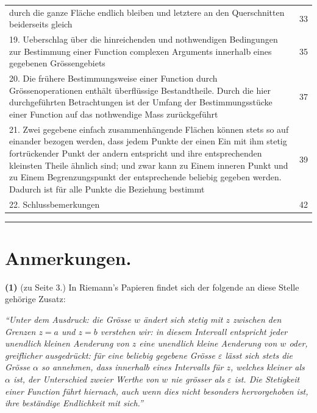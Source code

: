 \documentclass[12pt,a4paper]{book}
\theoremstyle{definition}
\theoremstyle{remark}
\begin{document}
\begin{center}
\begin{tabular}{p{}r}
\[\]
durch die ganze Fläche endlich bleiben und letztere an den Querschnitten beiderseits gleich \dotfill & 33\\[0.5em]
19. Ueberschlag über die hinreichenden und nothwendigen Bedingungen zur Bestimmung einer Function complexen Arguments innerhalb eines gegebenen Grössengebiets \dotfill & 35\\[0.5em]
20. Die frühere Bestimmungsweise einer Function durch Grössenoperationen enthält überflüssige Bestandtheile. Durch die hier durchgeführten Betrachtungen ist der Umfang der Bestimmungsstücke einer Function auf das nothwendige Mass zurückgeführt \dotfill & 37\\[0.5em]
21. Zwei gegebene einfach zusammenhängende Flächen können stets so auf einander bezogen werden, dass jedem Punkte der einen Ein mit ihm stetig fortrückender Punkt der andern entspricht und ihre entsprechenden kleinsten Theile ähnlich sind; und zwar kann zu Einem inneren Punkt und zu Einem Begrenzungspunkt der entsprechende beliebig gegeben werden. Dadurch ist für alle Punkte die Beziehung bestimmt \dotfill & 39\\[0.5em]
22. Schlussbemerkungen \dotfill & 42\\
\end{tabular}
\end{center}

\vspace{2em}
\begin{center}
\rule{0.5\textwidth}{0.4pt}
\end{center}
\vspace{1em}


\section*{Anmerkungen.}

\textbf{(1)} (zu Seite 3.) In Riemann's Papieren findet sich der folgende an diese Stelle gehörige Zusatz:

\smallskip
\textit{``Unter dem Ausdruck: die Grösse $w$ ändert sich stetig mit $z$ zwischen den Grenzen $z = a$ und $z = b$ verstehen wir: in diesem Intervall entspricht jeder unendlich kleinen Aenderung von $z$ eine unendlich kleine Aenderung von $w$ oder, greiflicher ausgedrückt: für eine beliebig gegebene Grösse $\varepsilon$ lässt sich stets die Grösse $\alpha$ so annehmen, dass innerhalb eines Intervalls für $z$, welches kleiner als $\alpha$ ist, der Unterschied zweier Werthe von $w$ nie grösser als $\varepsilon$ ist. Die Stetigkeit einer Function führt hiernach, auch wenn dies nicht besonders hervorgehoben ist, ihre beständige Endlichkeit mit sich.''}
\smallskip
\end{document}
